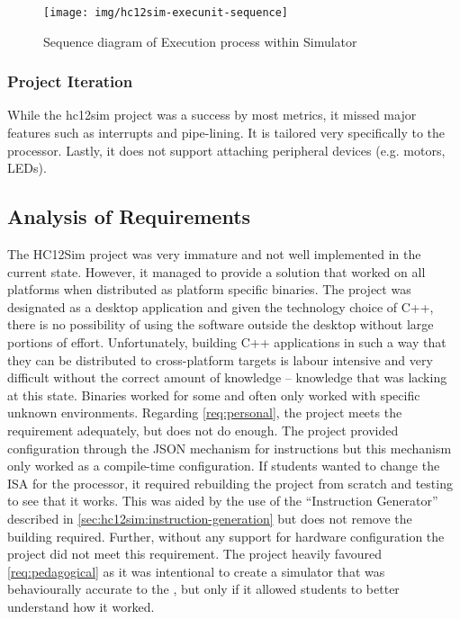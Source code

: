 \begin{figure}[!ph]
    \centering
    \texttt{[image: img/hc12sim-execunit-sequence]}
    \caption{Sequence diagram of Execution process within Simulator}
    \label{fig:hc12sim-execunit-sequence}
\end{figure} 


\subsubsection*{Project Iteration}

While the hc12sim project was a success by most metrics, it missed major features such as interrupts and pipe-lining. It is tailored very specifically to the \hcmodel{} processor. Lastly, it does not support attaching peripheral devices (e.g. motors, LEDs). 

\subsection*{Analysis of Requirements}
\label{sec:review-prev-hc12sim}

The HC12Sim project was very immature and not well implemented in the current state. However, it managed to provide a solution that worked on all platforms when distributed as platform specific binaries. The project was designated as a desktop application and given the technology choice of C++, there is no possibility of using the software outside the desktop without large portions of effort. Unfortunately, building C++ applications in such a way that they can be distributed to cross-platform targets is labour intensive and very difficult without the correct amount of knowledge -- knowledge that was lacking at this state. Binaries worked for some and often only worked with specific unknown environments. Regarding \cref{req:personal}, the project meets the requirement adequately, but does not do enough. The project provided configuration through the JSON mechanism for instructions but this mechanism only worked as a compile-time configuration. If students wanted to change the ISA for the processor, it required rebuilding the project from scratch and testing to see that it works. This was aided by the use of the ``Instruction Generator'' described in \cref{sec:hc12sim:instruction-generation} but does not remove the building required. Further, without any support for hardware configuration the project did not meet this requirement. The project heavily favoured \cref{req:pedagogical} as it was intentional to create a simulator that was behaviourally accurate to the \hcmodel, but only if it allowed students to better understand how it worked.

